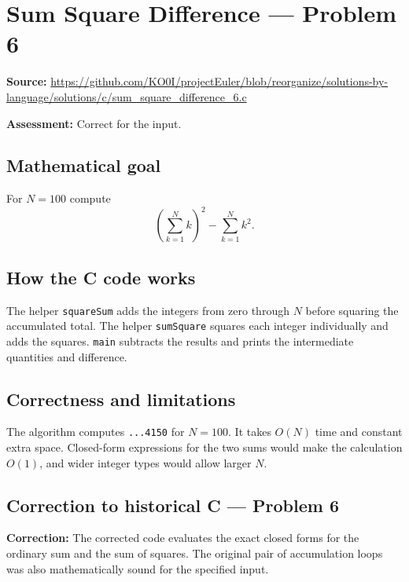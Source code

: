 \section{Sum Square Difference --- Problem 6}
\label{prob:6}
\noindent\textbf{Source:} \url{https://github.com/KO0I/projectEuler/blob/reorganize/solutions-by-language/solutions/c/sum_square_difference_6.c}

\noindent\textbf{Assessment:} Correct for the input.

\subsection*{Mathematical goal}
For \(N=100\) compute
\[
\left(\sum_{k=1}^{N}k\right)^2-\sum_{k=1}^{N}k^2.
\]

\subsection*{How the C code works}
The helper \verb|squareSum| adds the integers from zero through \(N\) before squaring the accumulated total. The helper \verb|sumSquare| squares each integer individually and adds the squares. \verb|main| subtracts the results and prints the intermediate quantities and difference.

\subsection*{Correctness and limitations}
The algorithm computes \texttt{...4150} for \(N=100\). It takes \(O(N)\) time and constant extra space. Closed-form expressions for the two sums would make the calculation \(O(1)\), and wider integer types would allow larger \(N\).


\subsection*{Correction to historical C --- Problem 6}
{\color{red}\textbf{Correction:} The corrected code evaluates the exact closed forms for the ordinary sum and the sum of squares. The original pair of accumulation loops was also mathematically sound for the specified input.}
